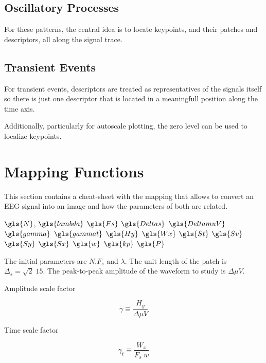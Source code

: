 \subsection{Oscillatory Processes}

For these patterns, the central idea is to locate keypoints, and their patches and descriptors, all along the signal trace. 

\subsection{Transient Events}

For transient events, descriptors are treated as representatives of the signals itself so there is just one descriptor that is located in a meaningfull position along the time axis.

Additionally, particularly for autoscale plotting, the zero level can be used to localize keypoints.

\section{Mapping Functions}

This section contains a cheat-sheet with the mapping that allows to convert an EEG signal into an image and how the parameters of both are related.

$\gls{N}$, 
$\gls{lambda}$
$\gls{Fs}$
$\gls{Deltas}$
$\gls{DeltamuV}$
$\gls{gamma}$
$\gls{gammat}$
$\gls{Hy}$
$\gls{Wx}$
$\gls{St}$
$\gls{Sv}$
$\gls{Sy}$
$\gls{Sx}$
$\gls{w}$
$\gls{kp}$
$\gls{P}$

The initial parameters are $N$,$F_s$ and $\lambda$.  The unit length of the patch is $\Delta_s = \sqrt{2} \; 15$.  The peak-to-peak amplitude of the waveform to study is $ \Delta \mu V $.

Amplitude scale factor

\begin{equation}
\gamma \equiv \frac{H_y}{\Delta \mu V}  
\label{eq:gammadefinition}
\end{equation}

Time scale factor

\begin{equation}
\gamma_t \equiv \frac{W_x}{F_s \; w}  
\label{eq:gammatdefinition}
\end{equation}

%

